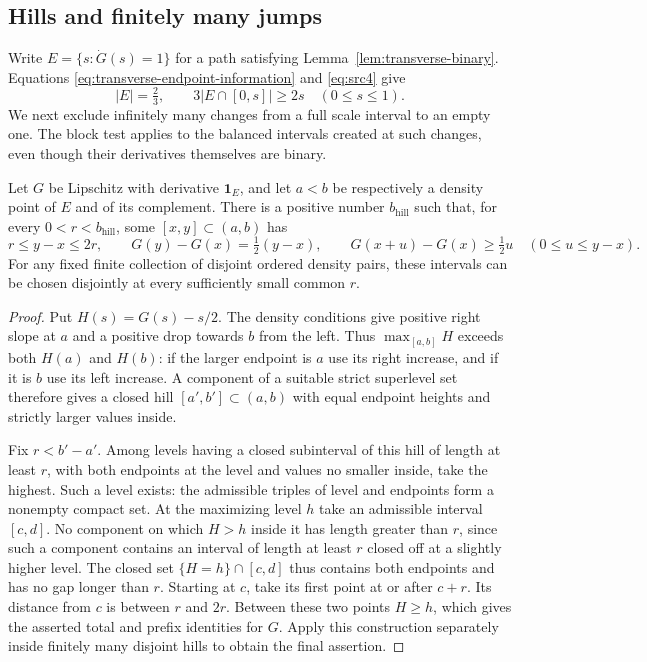 \subsection{Hills and finitely many jumps}

Write $E=\{s:\dot G(s)=1\}$ for a path satisfying
Lemma~\ref{lem:transverse-binary}.  Equations
\eqref{eq:transverse-endpoint-information} and \eqref{eq:src4} give
\begin{equation}\label{eq:transverse-full-set}
 |E|=\tfrac23,\qquad 3|E\cap[0,s]|\ge2s\quad(0\le s\le1).
\end{equation}
We next exclude infinitely many changes from a full scale interval
to an empty one.  The block test applies to the balanced intervals
created at such changes, even though their derivatives themselves
are binary.

\begin{lemma}
\label{lem:transverse-hills}
Let $G$ be Lipschitz with derivative $\mathbf1_E$, and let $a<b$
be respectively a density point of $E$ and of its complement.
There is a positive number $b_{\mathrm{hill}}$ such that, for every
$0<r<b_{\mathrm{hill}}$, some $[x,y]\subset(a,b)$ has
\[
 r\le y-x\le2r,\qquad
 G(y)-G(x)=\tfrac12(y-x),\qquad
 G(x+u)-G(x)\ge\tfrac12u\quad(0\le u\le y-x).
\]
For any fixed finite collection of disjoint ordered density pairs,
these intervals can be chosen disjointly at every sufficiently small
common $r$.
\end{lemma}

\begin{proof}
Put $H(s)=G(s)-s/2$.  The density conditions give positive right
slope at $a$ and a positive drop towards $b$ from the left.  Thus
$\max_{[a,b]}H$ exceeds both $H(a)$ and $H(b)$: if the larger
endpoint is $a$ use its right increase, and if it is $b$ use its
left increase.  A component of a suitable strict superlevel set
therefore gives a closed hill $[a',b']\subset(a,b)$ with equal
endpoint heights and strictly larger values inside.

Fix $r<b'-a'$.  Among levels having a closed subinterval of this
hill of length at least $r$, with both endpoints at the level and
values no smaller inside, take the highest.  Such a level exists:
the admissible triples of level and endpoints form a nonempty compact
set.  At the maximizing level $h$ take an admissible interval
$[c,d]$.  No component on which $H>h$ inside it has length greater
than $r$, since such a component contains an interval of length
at least $r$ closed off at a slightly higher level.  The closed
set $\{H=h\}\cap[c,d]$ thus contains both endpoints and has no
gap longer than $r$.  Starting at $c$, take its first point at or
after $c+r$.  Its distance from $c$ is between $r$ and $2r$.
Between these two points $H\ge h$, which gives the asserted total
and prefix identities for $G$.  Apply this construction separately
inside finitely many disjoint hills to obtain the final assertion.
\end{proof}

